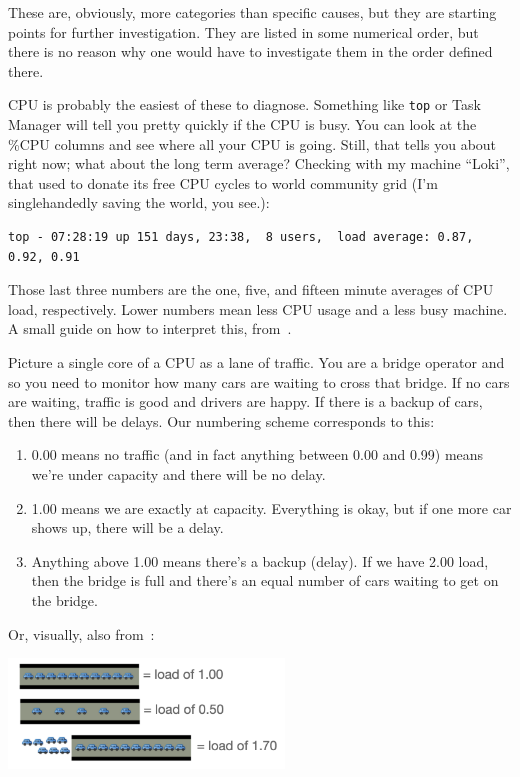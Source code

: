 \documentclass[a4paper]{report}
\begin{document}
These are, obviously, more categories than specific causes, but they are starting points for further investigation. They are listed in some numerical order, but there is no reason why one would have to investigate them in the order defined there.

CPU is probably the easiest of these to diagnose. Something like \texttt{top} or Task Manager will tell you pretty quickly if the CPU is busy. You can look at the \%CPU columns and see where all your CPU is going. Still, that tells you about right now; what about the long term average? Checking with my machine ``Loki'', that used to donate its free CPU cycles to world community grid (I'm singlehandedly saving the world, you see.):

\begin{verbatim}
top - 07:28:19 up 151 days, 23:38,  8 users,  load average: 0.87, 0.92, 0.91
\end{verbatim}

Those last three numbers are the one, five, and fifteen minute averages of CPU load, respectively. Lower numbers mean less CPU usage and a less busy machine. A small guide on how to interpret this, from~\cite{scout}.

Picture a single core of a CPU as a lane of traffic. You are a bridge operator and so you need to monitor how many cars are waiting to cross that bridge. If no cars are waiting, traffic is good and drivers are happy. If there is a backup of cars, then there will be delays. Our numbering scheme corresponds to this:

\begin{enumerate}
	\item 0.00 means no traffic (and in fact anything between 0.00 and 0.99) means we're under capacity and there will be no delay.
	\item 1.00 means we are exactly at capacity. Everything is okay, but if one more car shows up, there will be a delay.
	\item Anything above 1.00 means there's a backup (delay). If we have 2.00 load, then the bridge is full and there's an equal number of cars waiting to get on the bridge. 
\end{enumerate}

Or, visually, also from~\cite{scout}:

\begin{center}
	\includegraphics[width=0.55\textwidth]{images/car-analogy.png}
\end{center}
\end{document}
